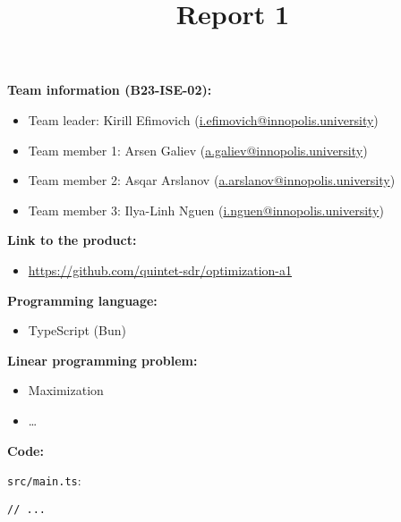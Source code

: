 \documentclass{article}
\title{\textbf{Report 1}}
\author{}
\date{}
\begin{document}
\maketitle

\thispagestyle{fancy}

\textbf{Team information (B23-ISE-02):}
\begin{itemize}[label=-]
    \item Team leader: Kirill Efimovich (\href{mailto:k.efimovich@innopolis.university}{i.efimovich@innopolis.university})
    \item Team member 1: Arsen Galiev (\href{mailto:a.galiev@innopolis.university}{a.galiev@innopolis.university})
    \item Team member 2: Asqar Arslanov (\href{mailto:a.arslanov@innopolis.university}{a.arslanov@innopolis.university})
    \item Team member 3: Ilya-Linh Nguen (\href{mailto:i.nguen@innopolis.university}{i.nguen@innopolis.university})
\end{itemize}

\textbf{Link to the product:}
\begin{itemize}[label=-]
    \item \url{https://github.com/quintet-sdr/optimization-a1}
\end{itemize}

\textbf{Programming language:}
\begin{itemize}[label=-]
    \item TypeScript (Bun)
\end{itemize}

\textbf{Linear programming problem:}
\begin{itemize}[label=-]
    \item Maximization
    \item \dots
\end{itemize}

\textbf{Code:}

\texttt{src/main.ts}:
\begin{lstlisting}
// ...
\end{lstlisting}
\end{document}
